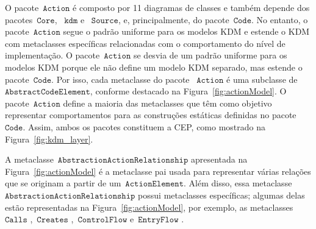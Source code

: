 O pacote~$\mathtt{Action}$ é composto por 11 diagramas de classes e também depende dos pacotes~$\mathtt{Core}$, ~$\mathtt{kdm}$ e ~$\mathtt{Source}$, e,  principalmente, do pacote~$\mathtt{Code}$. No entanto, o pacote~$\mathtt{Action}$ segue o padrão uniforme para os modelos KDM e estende o KDM com metaclasses específicas relacionadas com o comportamento do nível de implementação. O pacote~$\mathtt{Action}$ se desvia de um padrão uniforme para os modelos KDM porque ele não define um modelo KDM separado, mas estende o pacote~$\mathtt{Code}$.  Por isso, cada metaclasse do pacote ~$\mathtt{Action}$ é uma subclasse de~$\mathtt{AbstractCodeElement}$, conforme destacado na Figura~\ref{fig:actionModel}. O pacote~$\mathtt{Action}$ define a maioria das metaclasses que têm como objetivo representar comportamentos para as construções estáticas definidas no pacote~$\mathtt{Code}$. Assim, ambos os pacotes constituem a CEP, como mostrado na Figura~\ref{fig:kdm_layer}.


A metaclasse~$\mathtt{AbstractionActionRelationship}$ apresentada na Figura~\ref{fig:actionModel}  é a metaclasse pai usada para representar várias relações que se originam a partir de um~$\mathtt{ActionElement}$. Além disso, essa metaclasse~$\mathtt{AbstractionActionRelationship}$ possui metaclasses específicas; algumas delas estão representadas na Figura~\ref{fig:actionModel}, por exemplo, as metaclasses~$\mathtt{Calls}$ ,~$\mathtt{Creates}$ ,~$\mathtt{ControlFlow}$  e~$\mathtt{EntryFlow}$ .



